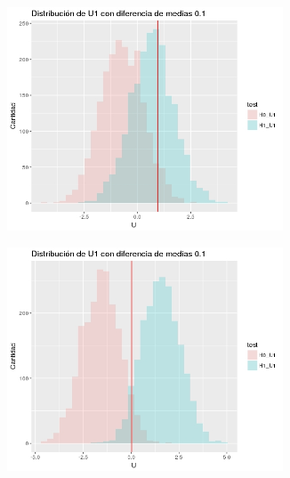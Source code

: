 \documentclass[%
 reprint,
 amsmath,amssymb,
 aps,
spanish]{revtex4-1}
\begin{document}
\begin{figure}[t]
    \centering
    \begin{subfigure}[t]{0.3\textwidth}
      \centering
      \includegraphics[width=0.9\textwidth]{imagenes/histograma_U1_01_100}
    \end{subfigure}
    \begin{subfigure}[t]{0.3\textwidth}
      \centering
      \includegraphics[width=0.9\textwidth]{imagenes/histograma_U1_01_500}
    \end{subfigure}
    \begin{subfigure}[t]{0.3\textwidth}
      \centering

\end{subfigure}
\end{figure}
\end{document}

